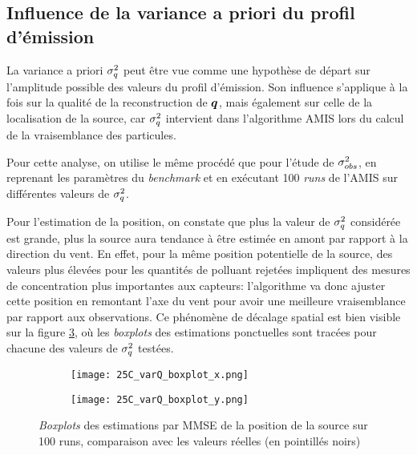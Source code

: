   	


\subsection{Influence de la variance a priori du profil d'émission}

La variance a priori $\sigma_q^2$ peut être vue comme une hypothèse de départ sur l'amplitude possible des valeurs du profil d'émission. Son influence s'applique à la fois sur la qualité de la reconstruction de ${\bm{q}}$, mais également sur celle de la localisation de la source, car $\sigma_q^2$ intervient dans l'algorithme AMIS lors du calcul de la vraisemblance des particules. 

Pour cette analyse, on utilise le même procédé que pour l'étude de ${\sigma_{obs}^2}$, en reprenant les paramètres du \textit{benchmark} et en exécutant 100 \textit{runs} de l'AMIS {sur différentes valeurs de $\sigma_q^2$.}

Pour l'estimation de la position, on constate que plus la valeur de $\sigma_q^2$ considérée est grande, plus la source aura tendance à être estimée en amont  par rapport à la direction du vent. En effet, pour la même position potentielle de la source, des valeurs plus élevées pour les quantités de polluant rejetées impliquent des mesures de concentration plus importantes aux capteurs: l'algorithme va donc ajuster cette position en remontant l'axe du vent pour avoir une meilleure vraisemblance par rapport aux observations. Ce phénomène de décalage spatial est bien visible sur la figure \ref{fig_25C_varQ_boxplots}, où les \textit{boxplots} des estimations ponctuelles sont tracées pour chacune des valeurs de $\sigma_q^2$ testées.

\begin{figure}[h!]
	\centering
         	\begin{subfigure}[t]{0.5\textwidth}
         		\centering
         		\texttt{[image: 25C\_varQ\_boxplot\_x.png]}
         		\caption{}
         		\label{varQ_boxplot_x}
         	\end{subfigure}%
         \begin{subfigure}[t]{0.5\textwidth}
         	\centering
         	\texttt{[image: 25C\_varQ\_boxplot\_y.png]}
         	\caption{}
         	\label{varQ_boxplot_y}
         \end{subfigure}%
         \caption{\textit{Boxplots} des estimations par MMSE de la position de la source sur 100 runs, comparaison avec les valeurs réelles (en pointillés noirs)}
         \label{fig_25C_varQ_boxplots}
	
\end{figure}

